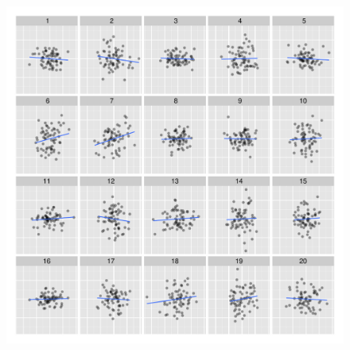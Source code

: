 \documentclass{article} %
\begin{document}
\begin{figure}
	\centering
	\includegraphics[width=\textwidth]{normexam_uncorr_lineup13.pdf}
	\caption{\label{fig:ranef-uncorr}}
\end{figure}
\end{document}
